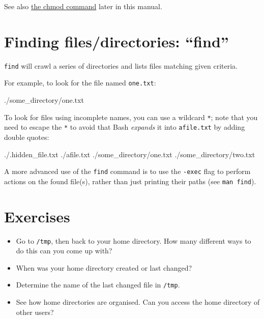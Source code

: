 See also \hyperref[sec:chmod]{the chmod command} later in this manual.

\section{Finding files/directories: ``find''}

\lstinline|find| will crawl a series of directories and lists files matching given criteria.

For example, to look for the file named \lstinline|one.txt|:

\begin{prompt}
./some_directory/one.txt
\end{prompt}

To look for files using incomplete names, you can use a wildcard \lstinline|*|; note
that you need to escape the \lstinline|*| to avoid that Bash \emph{expands} it into
\lstinline|afile.txt| by adding double quotes:

\begin{prompt}
./.hidden_file.txt
./afile.txt
./some_directory/one.txt
./some_directory/two.txt
\end{prompt}

A more advanced use of the \lstinline|find| command is to use the \lstinline|-exec| flag
to perform actions on the found file(s), rather than just printing their paths (see \lstinline|man find|).

\section{Exercises}

\begin{itemize}
    \item Go to \lstinline|/tmp|, then back to your home directory.
        How many different ways to do this can you come up with?
    \item When was your home directory created or last changed?
    \item Determine the name of the last changed file in \lstinline|/tmp|.
    \item See how home directories are organised.
        Can you access the home directory of other users?
\end{itemize}
